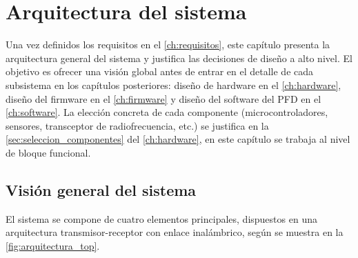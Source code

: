 
\chapter{Arquitectura del sistema}
\label{ch:arquitectura}

Una vez definidos los requisitos en el \cref{ch:requisitos}, este capítulo
presenta la arquitectura general del sistema y justifica las decisiones de
diseño a alto nivel. El objetivo es ofrecer una visión global antes de entrar
en el detalle de cada subsistema en los capítulos posteriores: diseño de
hardware en el \cref{ch:hardware}, diseño del firmware en el
\cref{ch:firmware} y diseño del software del PFD en el \cref{ch:software}.
La elección concreta de cada componente (microcontroladores, sensores,
transceptor de radiofrecuencia, etc.) se justifica en la
\cref{sec:seleccion_componentes} del \cref{ch:hardware}, en este capítulo se
trabaja al nivel de bloque funcional.

\section{Visión general del sistema}
\label{sec:vision_general}

El sistema se compone de cuatro elementos principales, dispuestos
en una arquitectura transmisor-receptor con enlace inalámbrico, según se muestra
en la \cref{fig:arquitectura_top}.

